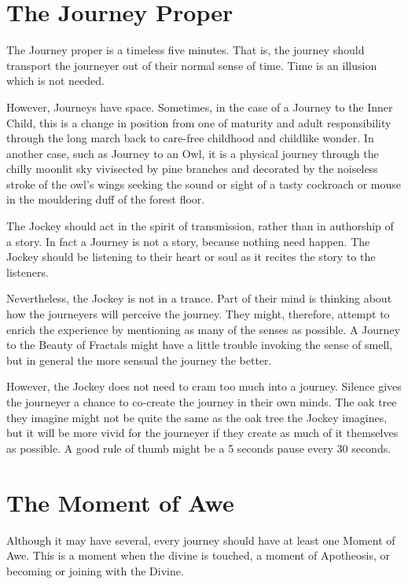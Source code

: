 \documentclass[12pt]{book}
\begin{document}
\section{The Journey Proper}
					
The Journey proper is a timeless five minutes. That is, the journey should transport the journeyer out of their normal sense of time. Time is an illusion which is not needed.
					
However, Journeys have space. Sometimes, in the case of a Journey to the Inner Child, this is a change in position from one of maturity and adult responsibility through the long march back to care-free childhood and childlike wonder. In another case, such as Journey to an Owl, it is a physical journey through the chilly moonlit sky vivisected by pine branches and decorated by the noiseless stroke of the owl’s wings seeking the sound or sight of a tasty cockroach or mouse in the mouldering duff of the forest floor.
					
The Jockey should act in the spirit of transmission, rather than in authorship of a story. In fact a Journey is not a story, because nothing need happen. The Jockey should be listening to their heart or soul as it recites the story to the listeners.
					
Nevertheless, the Jockey is not in a trance. Part of their mind is thinking about how the journeyers will perceive the journey. They might, therefore, attempt to enrich the experience by mentioning as many of the senses as possible. A Journey to the Beauty of Fractals might have a little trouble invoking the sense of smell, but in general the more sensual the journey the better.
					
However, the Jockey does not need to cram too much into a journey. Silence gives the journeyer a chance to co-create the journey in their own minds. The oak tree they imagine might not be quite the same as the oak tree the Jockey imagines, but it will be more vivid for the journeyer if they create as much of it themselves as possible. A good rule of thumb might be a 5 seconds pause every 30 seconds.
					
\section{The Moment of Awe}
					
Although it may have several, every journey should have at least one Moment of Awe. This is a moment when the divine is touched, a moment of Apotheosis, or becoming or joining with the Divine.
					
\end{document}
